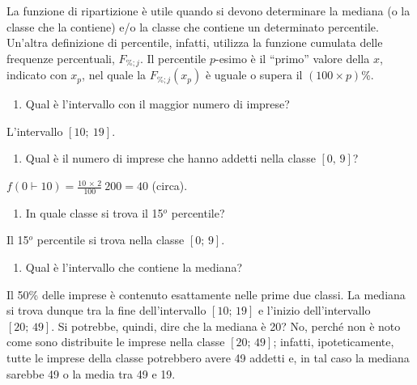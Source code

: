 \documentclass[
  11pt,
]{book}
\providecommand{\tightlist}{%
  \setlength{\itemsep}{0pt}\setlength{\parskip}{0pt}}
\theoremstyle{mytheoremstyle}
\theoremstyle{mydefstyle}
\newenvironment{sol}
  {
  \begin{tcolorbox}[enhanced,breakable,arc=0.1mm,boxrule=1pt,colback=white,colframe=iblue,
  title=\bf \fontfamily{lmss}\selectfont \hspace{.5 cm} Soluzione,drop fuzzy shadow]

}{
\end{tcolorbox}
  }
\begin{document}
\begin{sol}
La funzione di ripartizione è utile quando si devono determinare
la mediana (o la classe che la contiene) e/o la classe che contiene
un determinato percentile.
Un'altra definizione di percentile, infatti, utilizza la
funzione cumulata delle frequenze percentuali, \(F_{\%; j}\).
Il percentile \(p\)-esimo è il ``primo'' valore della \(x\),
indicato con \(x_{p}\), nel quale la \(F_{\%; j}(x_{p})\) è uguale
o supera il \((100 \times p)\)\%.

\end{sol}

\begin{enumerate}
\def\labelenumi{\alph{enumi}.}
\tightlist
\item
  Qual è l'intervallo con il maggior numero di imprese?
\end{enumerate}

\begin{sol}
L'intervallo \([10;\ 19]\).

\end{sol}

\begin{enumerate}
\def\labelenumi{\alph{enumi}.}
\setcounter{enumi}{1}
\tightlist
\item
  Qual è il numero di imprese che hanno addetti
  nella classe \([0,\, 9]\)?
\end{enumerate}

\begin{sol}
\(f\left( 0 \vdash 10 \right) = \frac{10 \,\times\, 2} {100}\ 200 = 40\) (circa).

\end{sol}

\begin{enumerate}
\def\labelenumi{\alph{enumi}.}
\setcounter{enumi}{2}
\tightlist
\item
  In quale classe si trova il 15\(^{o}\) percentile?
\end{enumerate}

\begin{sol}
Il 15\(^{o}\) percentile si trova nella classe \([0;\, 9]\).

\end{sol}

\begin{enumerate}
\def\labelenumi{\alph{enumi}.}
\setcounter{enumi}{3}
\tightlist
\item
  Qual è l'intervallo che contiene la mediana?
\end{enumerate}

\begin{sol}
Il 50\% delle imprese è contenuto esattamente nelle prime due classi.
La mediana si trova dunque tra la fine dell'intervallo
\([10;\, 19]\) e l'inizio dell'intervallo \([20;\, 49]\).
Si potrebbe, quindi, dire che la mediana è 20?
No, perché non è noto come sono distribuite le imprese nella classe
\([20;\, 49]\); infatti, ipoteticamente, tutte le imprese della classe
potrebbero avere 49 addetti e, in tal caso la mediana sarebbe 49 o
la media tra 49 e 19.

\end{sol}
\end{document}
